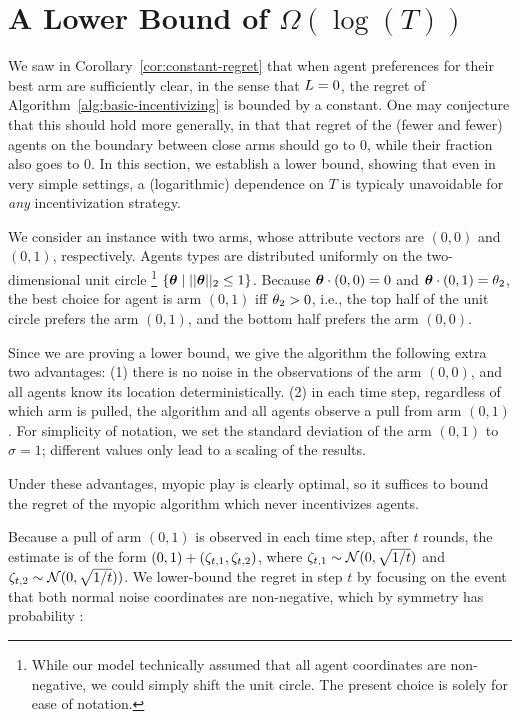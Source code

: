 \section{A Lower Bound of $\Omega(\log(T))$} \label{sec:lb}

We saw in Corollary~\ref{cor:constant-regret} that
when agent preferences for their best arm are sufficiently clear,
in the sense that $L = 0$, the regret of
Algorithm~\ref{alg:basic-incentivizing} is bounded by a constant.
One may conjecture that this should hold more generally,
in that that regret of the (fewer and fewer) agents on the boundary
between close arms should go to 0, while their fraction also goes to 0.
In this section, we establish a lower bound,
showing that even in very simple settings, a (logarithmic) dependence
on $T$ is typicaly unavoidable for \emph{any} incentivization strategy.

We consider an instance with two arms,
whose attribute vectors are $(0,0)$ and $(0,1)$, respectively.
Agents types are distributed uniformly on the two-dimensional unit circle%
\footnote{While our model technically assumed that all agent coordinates are
non-negative, we could simply shift the unit circle.
The present choice is solely for ease of notation.}  
$\{ \bm{\theta} \mid || \bm{\theta} ||_2 \leq 1 \}$.
Because $\bm{\theta} \cdot (0,0) = 0$ and $\bm{\theta} \cdot (0,1) = \theta_{2}$,
the best choice for agent \AgV is arm $(0,1)$ iff $\theta_{2} > 0$,
i.e., the top half of the unit circle prefers the arm $(0,1)$,
and the bottom half prefers the arm $(0,0)$.

Since we are proving a lower bound, we give the algorithm the
following extra two advantages:
(1) there is no noise in the observations of the arm $(0,0)$,
and all agents know its location deterministically.
(2) in each time step, regardless of which arm is pulled, the algorithm
and all agents observe a pull from arm $(0,1)$.
For simplicity of notation, we set the standard deviation of the arm
$(0,1)$ to $\sigma = 1$; different values only lead to a scaling of
the results.

Under these advantages, myopic play is clearly optimal, so it suffices
to bound the regret of the myopic algorithm which never incentivizes
agents. 

Because a pull of arm $(0,1)$ is observed in each time step,
after $t$ rounds, the estimate  is of the form
$(0,1) + (\Noise[t]{1}, \Noise[t]{2})$,
where $\Noise[t]{1} \sim \Normal{0}{\sqrt{1/t}}$
and $\Noise[t]{2} \sim \Normal{0}{\sqrt{1/t}})$.
We lower-bound the regret in step $t$ by focusing on the event that
both normal noise coordinates are non-negative,
which by symmetry has probability \quarter:

